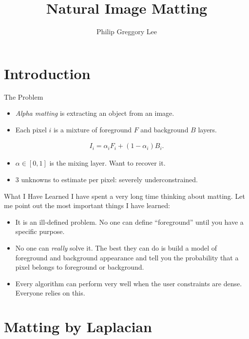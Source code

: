 \documentclass{beamer}
\title{Natural Image Matting}
\author{Philip Greggory Lee}
\institute{
 Electrical Engineering and Computer Science\\
 Northwestern University\\
 Evanston, IL 60208
}
\begin{document}
\begin{frame}
 \titlepage
\end{frame}

\section{Introduction}%

\begin{frame}{The Problem}
 \begin{itemize}
  \item \textit{Alpha matting} is extracting an object from an image.
  \item Each pixel $i$ is a mixture of foreground $F$ and background $B$ layers.
 \end{itemize}
 \begin{align}
   I_i = \alpha_i F_i + (1-\alpha_i)B_i.
 \end{align}
 \begin{itemize}
  \item $\alpha \in [0,1]$ is the mixing layer. Want to recover it.
  \item 3 unknowns to estimate per pixel: severely underconstrained.
 \end{itemize}
\end{frame}

\begin{frame}{What I Have Learned}
 I have spent a very long time thinking about matting. Let me point out the
 most important things I have learned:
 \begin{itemize}
  \item It is an ill-defined problem. No one can define ``foreground'' until
        you have a specific purpose.
  \item No one can \textit{really} solve it. The best they can do is build a
        model of foreground and background appearance and tell you the
        probability that a pixel belongs to foreground or background.
  \item Every algorithm can perform very well when the user constraints are
        dense. Everyone relies on this.
 \end{itemize}
\end{frame}

\section{Matting by Laplacian}%
\end{document}
